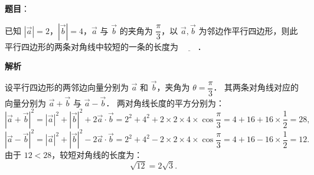 \begin{answer}

\textbf{题目}：

已知 $|\vec{a}| = 2$，$|\vec{b}| = 4$，$\vec{a}$ 与 $\vec{b}$ 的夹角为 $\dfrac{\pi}{3}$，以 $\vec{a}, \vec{b}$ 为邻边作平行四边形，则此平行四边形的两条对角线中较短的一条的长度为 $\underline{\hspace{2em}}$．

\textbf{解析}

设平行四边形的两邻边向量分别为 $\vec{a}$ 和 $\vec{b}$，夹角为 $\theta = \dfrac{\pi}{3}$．
其两条对角线对应的向量分别为 $\vec{a} + \vec{b}$ 与 $\vec{a} - \vec{b}$．
两对角线长度的平方分别为：
\nopagebreak[4]
\[
|\vec{a} + \vec{b}|^2 = |\vec{a}|^2 + |\vec{b}|^2 + 2\vec{a}\cdot\vec{b} = 2^2 + 4^2 + 2 \times 2 \times 4 \times \cos\dfrac{\pi}{3} = 4 + 16 + 16 \times \dfrac{1}{2} = 28,
\]
\nopagebreak[4]
\[
|\vec{a} - \vec{b}|^2 = |\vec{a}|^2 + |\vec{b}|^2 - 2\vec{a}\cdot\vec{b} = 2^2 + 4^2 - 2 \times 2 \times 4 \times \cos\dfrac{\pi}{3} = 4 + 16 - 16 \times \dfrac{1}{2} = 12.
\]
由于 $12 < 28$，较短对角线的长度为：
\nopagebreak[4]
\[
\sqrt{12} = 2\sqrt{3}.
\]


\end{answer}
